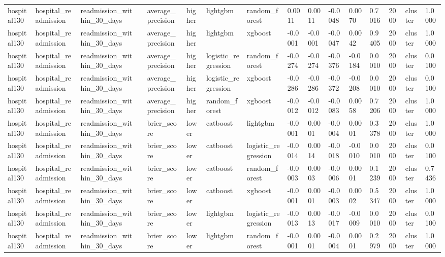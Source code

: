 \begin{tabular}{llllllllllllllll}
hospital130 & hospital\_readmission & readmission\_within\_30\_days &  & average\_precision & higher & lightgbm & random\_forest & 0.0011 & 0.0011 & -0.0048 & 0.0070 & 0.7016 & 2000 & cluster & 1.0000 \\
hospital130 & hospital\_readmission & readmission\_within\_30\_days &  & average\_precision & higher & lightgbm & xgboost & -0.0001 & -0.0001 & -0.0047 & 0.0042 & 0.9405 & 2000 & cluster & 1.0000 \\
hospital130 & hospital\_readmission & readmission\_within\_30\_days &  & average\_precision & higher & logistic\_regression & random\_forest & -0.0274 & -0.0274 & -0.0376 & -0.0184 & 0.0010 & 2000 & cluster & 0.0100 \\
hospital130 & hospital\_readmission & readmission\_within\_30\_days &  & average\_precision & higher & logistic\_regression & xgboost & -0.0286 & -0.0286 & -0.0372 & -0.0208 & 0.0010 & 2000 & cluster & 0.0100 \\
hospital130 & hospital\_readmission & readmission\_within\_30\_days &  & average\_precision & higher & random\_forest & xgboost & -0.0012 & -0.0012 & -0.0083 & 0.0058 & 0.7206 & 2000 & cluster & 1.0000 \\
hospital130 & hospital\_readmission & readmission\_within\_30\_days &  & brier\_score & lower & catboost & lightgbm & -0.0001 & 0.0001 & -0.0004 & 0.0001 & 0.3378 & 2000 & cluster & 1.0000 \\
hospital130 & hospital\_readmission & readmission\_within\_30\_days &  & brier\_score & lower & catboost & logistic\_regression & -0.0014 & 0.0014 & -0.0018 & -0.0010 & 0.0010 & 2000 & cluster & 0.0100 \\
hospital130 & hospital\_readmission & readmission\_within\_30\_days &  & brier\_score & lower & catboost & random\_forest & -0.0003 & 0.0003 & -0.0006 & 0.0001 & 0.1239 & 2000 & cluster & 0.7436 \\
hospital130 & hospital\_readmission & readmission\_within\_30\_days &  & brier\_score & lower & catboost & xgboost & -0.0001 & 0.0001 & -0.0003 & 0.0002 & 0.5347 & 2000 & cluster & 1.0000 \\
hospital130 & hospital\_readmission & readmission\_within\_30\_days &  & brier\_score & lower & lightgbm & logistic\_regression & -0.0013 & 0.0013 & -0.0017 & -0.0009 & 0.0010 & 2000 & cluster & 0.0100 \\
hospital130 & hospital\_readmission & readmission\_within\_30\_days &  & brier\_score & lower & lightgbm & random\_forest & -0.0001 & 0.0001 & -0.0004 & 0.0001 & 0.2979 & 2000 & cluster & 1.0000 \\

\end{tabular}
